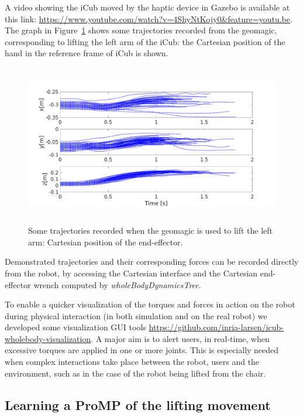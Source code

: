 A video showing the iCub moved by the haptic device in Gazebo is available at this link: \url{https://www.youtube.com/watch?v=4ShyNtKojy0&feature=youtu.be}.
The graph in Figure~\ref{fig:trajectories} shows some trajectories recorded from the geomagic, corresponding to lifting the left arm of the iCub: the Cartesian position of the hand in the reference frame of iCub is shown.
\begin{figure}[h]
\centering
\includegraphics[height=7cm]{figs/geomagic_lifting_trajectories.pdf}
\caption{Some trajectories recorded when the geomagic is used to lift the left arm: Cartesian position of the end-effector.}
\label{fig:trajectories}
\end{figure}

Demonstrated trajectories and their corresponding forces can be recorded directly from the robot, by accessing the Cartesian interface and the Cartesian end-effector wrench computed by \textit{wholeBodyDynamicsTree}.

To enable a quicker visualization of the torques and forces in action on the robot during physical interaction (in both simulation and on the real robot) we developed some visualization GUI tools \url{https://github.com/inria-larsen/icub-wholebody-visualization}.
A major aim is to alert users, in real-time, when excessive torques are applied in one or more joints. This is especially needed when complex interactions take place between the robot, users and the environment, such as in the case of the robot being lifted from the chair.

 


\subsection{Learning a ProMP of the lifting movement}

